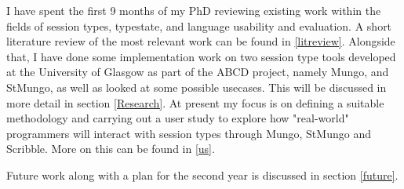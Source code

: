 I have spent the first 9 months of my PhD reviewing existing work within the fields of session types, typestate, and language usability and evaluation. A short literature review of the most relevant work can be found in \ref{litreview}. Alongside that, I have done some implementation work on two session type tools developed at the University of Glasgow as part of the ABCD project\cite{abcd}, namely Mungo, and StMungo\cite{mungo}, as well as looked at some possible usecases. This will be discussed in more detail in section \ref{Research}. At present my focus is on defining a suitable methodology and carrying out a user study to explore how "real-world" programmers will interact with session types through Mungo, StMungo and Scribble. More on this can be found in \ref{us}.

Future work along with a plan for the second year is discussed in section \ref{future}.


